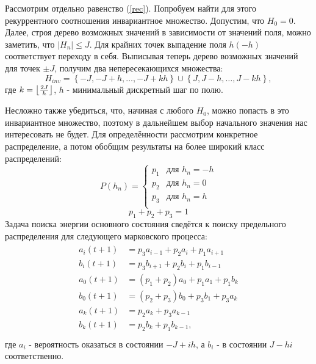 	Рассмотрим отдельно равенство (\ref{rec}). 
	Попробуем найти для этого рекуррентного соотношения инвариантное множество. Допустим, что $H_0=0$.
	 Далее, строя дерево возможных значений в зависимости от значений поля, можно заметить, что $|H_{n}| \leq J$. Для крайних точек выпадение поля $h (-h)$ соответствует переходу в себя.
	Выписывая теперь дерево возможных значений для точек $\pm J$, получим два непересекающихся множества:
	 \begin{equation}
		H_{inv} = \left\{ -J, -J + h, \dots, -J + kh \right\} \cup \left\{ J, J - h, \dots, J - kh \right\},
	\end{equation}
	где $k = \floor*{ \frac{2J}{h}}$, $h$ - минимальный дискретный шаг по полю.

	Несложно также убедиться, что, начиная с любого $H_0$, можно попасть в это инвариантное множество, поэтому в дальнейшем выбор начального значения нас интересовать не будет.
	Для определённости рассмотрим конкретное распределение, а потом обобщим результаты на более широкий класс распределений:
\begin{equation}
P(h_n) =
\begin{cases}
p_1 &\mbox{для } h_n= -h \\
p_2 &\mbox{для } h_n= 0 \\
p_3 &\mbox{для } h_n= h\\
\end{cases}
\end{equation}
\begin{equation}
p_1+p_2+p_3 = 1
\end{equation}
Задача поиска энергии основного состояния сведётся к поиску предельного распределения для следующего марковского процесса:
\begin{align}
\begin{split}
a_i(t+1) &= p_3 a_{i-1} + p_2 a_i + p_1 a_{i+1}\\
b_i(t+1)&= p_3 b_{i+1} + p_2 b_i + p_1 b_{i-1}\\
a_0(t+1)&= (p_1 + p_2) a_0 + p_1 a_1 + p_1 b_k\\
b_0(t+1) &= (p_2 + p_3) b_0 + p_3 b_1 + p_3 a_k \\
a_k(t+1) &= p_2 a_k + p_3 a_{k-1}\\
b_k(t+1) &= p_2 b_k + p_1 b_{k-1},\\
\end{split}
\end{align}
где $a_i$ - вероятность оказаться в состоянии $-J+ih$, а $b_i$ - в состоянии $J-hi$ соответственно.

